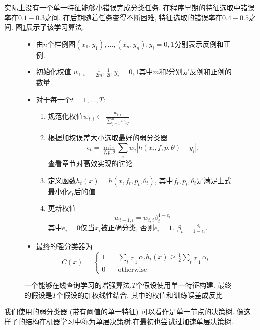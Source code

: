 \documentclass[a4paper,utf8,11pt, onecolumn]{ctexart}
\begin{document}
实际上没有一个单一特征能够小错误完成分类任务. 在程序早期的特征选取中错误率在$0.1-0.3$之间. 在后期随着任务变得不断困难, 特征选取的错误率在$0.4-0.5$之间. 图\ref{fig:adaboost}展示了该学习算法.
\begin{figure}[htb]
\kaishu{}
    \caption{一个能够在线查询学习的增强算法.$T$个假设使用单一特征构建. 最终的假设是$T$个假设的加权线性结合, 其中的权值和训练误差成反比}
    \label{fig:adaboost}
    \begin{itemize}
        \item 由$n$个样例图$(x_1,y_1),\ldots,(x_n,y_n), y_i=0, 1$分别表示反例和正例.
        \item 初始化权值 $w_{1,i}=\frac{1}{2m}, \frac{1}{2l},y_i=0,1$其中$m$和$l$分别是反例和正例的数量.
        \item 对于每一个$t=1,\ldots,T$:
            \begin{enumerate}
                \item 规范化权值$w_{t,i}\leftarrow \frac{w_{t,i}}{\sum_{j=1}^n w_{t,j}}$
                \item 根据加权误差大小选取最好的弱分类器
                    \[
                        \epsilon_t=\min_{f,p,\theta}\sum_i{w_i| h(x_i,f,p,\theta)-y_i |}.
                    \]
                    查看章节对高效实现的讨论
                \item 定义函数$h_t(x)=h(x,f_t,p_t,\theta_t)$, 其中$f_t,p_t,\theta_t$是满足上式最小化$\epsilon_t$后的值
                \item 更新权值
                    \[
                        w_{t+1,i}=w_{t,i}\beta_t^{1-e_i}
                    \]
                    其中$e_i=0$仅当$x_i$被正确分类, 否则$e_i=1$. $\beta_t=\frac{\epsilon_t}{1-\epsilon_t}$.
            \end{enumerate}
        \item 最终的强分类器为
            \[
                C(x)=
                \begin{cases}
                    1 &\quad\sum\limits_{t=1}\limits^T \alpha_t h_t(x)\geq \frac12\sum\limits_{t=1}\limits^T\alpha_t\\
                    0 &\quad\text{otherwise}
                \end{cases}
            \]
    \end{itemize}
\end{figure}

我们使用的弱分类器 (带有阈值的单一特征) 可以看作是单一节点的决策树. 像这样子的结构在机器学习中称为单层决策树.\citet{freund1995desicion}在最初也尝试过加速单层决策树.
\end{document}
